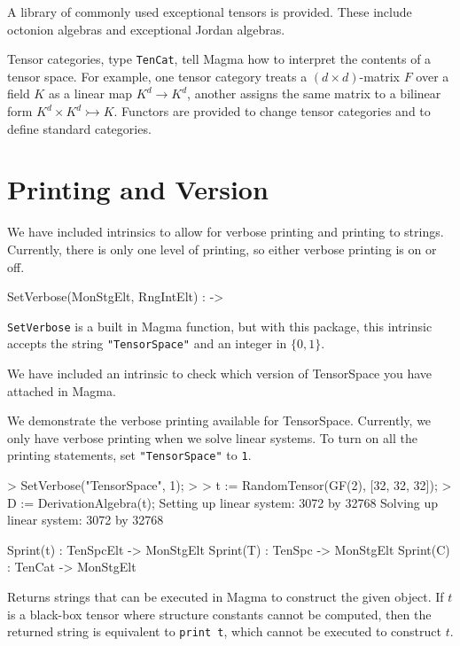 \documentclass{documentation}
\begin{document}
A library of commonly used exceptional tensors is provided.
These include octonion algebras and exceptional Jordan algebras.
 
Tensor categories, type {\tt TenCat}, tell Magma how to interpret the
contents of a tensor space.  For example, one tensor category treats a 
$(d\times d)$-matrix $F$ over a field $K$ as a linear map $K^d\to K^d$,
another assigns the same matrix to a bilinear form 
$K^d\times K^d\rightarrowtail K$.  Functors are provided to change
tensor categories and to define standard categories.  

\section{Printing and Version}

We have included intrinsics to allow for verbose printing and printing to strings. 
Currently, there is only one level of printing, so either verbose printing is on or off. 

\begin{intrinsics}
SetVerbose(MonStgElt, RngIntElt) : -> 
\end{intrinsics}

{\tt SetVerbose} is a built in Magma function, but with this package, this
intrinsic accepts the string \texttt{"TensorSpace"} and an integer in $\{0,1\}$.


We have included an intrinsic to check which version of TensorSpace you have attached in Magma.

\begin{example}[VerbosePrinting]
We demonstrate the verbose printing available for TensorSpace. 
Currently, we only have verbose printing when we solve linear systems. 
To turn on all the printing statements, set \texttt{"TensorSpace"} to {\tt 1}. 

\begin{code}
> SetVerbose("TensorSpace", 1);
> 
> t := RandomTensor(GF(2), [32, 32, 32]);
> D := DerivationAlgebra(t);
Setting up linear system: 3072 by 32768
Solving up linear system: 3072 by 32768
\end{code}
\end{example}

\begin{intrinsics}
Sprint(t) : TenSpcElt -> MonStgElt
Sprint(T) : TenSpc -> MonStgElt
Sprint(C) : TenCat -> MonStgElt
\end{intrinsics}

Returns strings that can be executed in Magma to construct the given object. If
$t$ is a black-box tensor where structure constants cannot be computed, then the
returned string is equivalent to \texttt{print t}, which cannot be executed to
construct $t$. 
\end{document}

